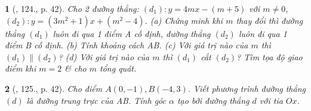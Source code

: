 \documentclass{article}
\newtheorem{baitoan}{}
\begin{document}
\begin{baitoan}[\cite{Tuyen_Toan_9_old}, 124., p. 42]
	Cho 2 đường thẳng: $(d_1):y = 4mx - (m + 5)$ với $m\ne0$, $(d_2):y = (3m^2 + 1)x + (m^2 - 4)$. (a) Chứng minh khi $m$ thay đổi thì đường thẳng $(d_1)$ luôn đi qua 1 điểm A cố định, đường thẳng $(d_2)$ luôn đi qua 1 điểm B cố định. (b) Tính khoảng cách AB. (c) Với giá trị nào của $m$ thì $(d_1)\parallel(d_2)$? (d) Với giá trị nào của $m$ thì $(d_1)$ cắt $(d_2)$? Tìm tọa độ giao điểm khi $m = 2$ \& cho $m$ tổng quát.
\end{baitoan}

\begin{baitoan}[\cite{Tuyen_Toan_9_old}, 125., p. 42]
	Cho điểm $A(0,-1),B(-4,3)$. Viết phương trình đường thẳng $(d)$ là đường trung trực của AB. Tính góc $\alpha$ tạo bởi đường thẳng $d$ với tia $Ox$.
\end{baitoan}


\printbibliography[heading=bibintoc]
	
\end{document}
